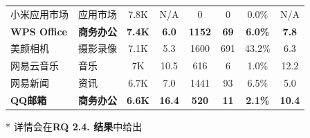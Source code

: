 \begin{ThreePartTable}
\begin{longtable}{l l c c c c c c}
        \rowcolor{gray!15} 小米应用市场              & 应用市场       & 7.8K                       & N/A                        & 0              & 0                          & 0.0\%        & N/A                        \\
        {\bf WPS Office}\tnote{*}                    & {\bf 商务办公} & {\bf 7.4K}                 & {\bf 6.0}                  & {\bf 1152}     & {\bf 69}                   & {\bf 6.0\%}  & {\bf 7.8}                  \\
        \rowcolor{gray!15} 美颜相机                  & 摄影录像       & 7.1K                       & 5.3                        & 1600           & 691                        & 43.2\%       & 6.3                        \\
        网易云音乐                                   & 音乐           & 7K                         & 10.5                       & 616            & 6                          & 1.0\%        & 12.2                       \\
        \rowcolor{gray!15} 网易新闻                  & 资讯           & 6.7K                       & 7.0                        & 1441           & 93                         & 6.5\%        & 5.0                        \\
        {\bf QQ邮箱}\tnote{*}                        & {\bf 商务办公} & {\bf 6.6K}                 & {\bf 16.4}                 & {\bf 520}      & {\bf 11}                   & {\bf 2.1\%}  & {\bf 10.4}                 \\
        \bottomrule
    \end{longtable}
    \vspace{-4mm}
    \begin{tablenotes}
        \item[*] 详情会在{\bf RQ 2.4. 结果}中给出
    \end{tablenotes}
\end{ThreePartTable}

